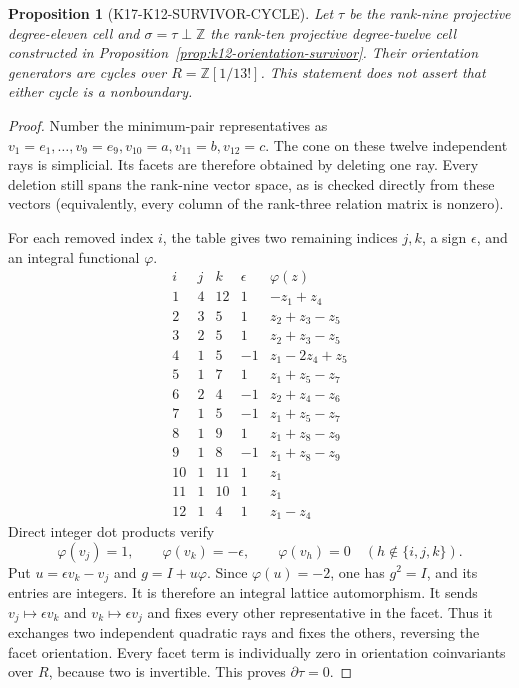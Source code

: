 \documentclass[11pt,a4paper]{article}
\newtheorem{proposition}[theorem]{Proposition}
\theoremstyle{definition}
\begin{document}
\begin{proposition}[K17-K12-SURVIVOR-CYCLE]
\label{prop:k12-survivor-cycle}
Let $\tau$ be the rank-nine projective degree-eleven cell and
$\sigma=\tau\perp\mathbb Z$ the rank-ten projective degree-twelve
cell constructed in Proposition~\ref{prop:k12-orientation-survivor}.
Their orientation generators are cycles over $R=\mathbb Z[1/13!]$.
This statement does not assert that either cycle is a nonboundary.
\end{proposition}

\begin{proof}
Number the minimum-pair representatives as
$v_1=e_1,\ldots,v_9=e_9,v_{10}=a,v_{11}=b,v_{12}=c$.
The cone on these twelve independent rays is simplicial. Its facets
are therefore obtained by deleting one ray. Every deletion still
spans the rank-nine vector space, as is checked directly from these
vectors (equivalently, every column of the rank-three relation
matrix is nonzero).

For each removed index $i$, the table gives two remaining indices
$j,k$, a sign $\epsilon$, and an integral functional $\varphi$.
\[
\begin{array}{c|cc|r|l}
i&j&k&\epsilon&\varphi(z)\\\hline
1&4&12&1&-z_1+z_4\\
2&3&5&1&z_2+z_3-z_5\\
3&2&5&1&z_2+z_3-z_5\\
4&1&5&-1&z_1-2z_4+z_5\\
5&1&7&1&z_1+z_5-z_7\\
6&2&4&-1&z_2+z_4-z_6\\
7&1&5&-1&z_1+z_5-z_7\\
8&1&9&1&z_1+z_8-z_9\\
9&1&8&-1&z_1+z_8-z_9\\
10&1&11&1&z_1\\
11&1&10&1&z_1\\
12&1&4&1&z_1-z_4
\end{array}
\]
Direct integer dot products verify
\[
\varphi(v_j)=1,\qquad \varphi(v_k)=-\epsilon,\qquad
\varphi(v_h)=0\quad(h\notin\{i,j,k\}).
\]
Put $u=\epsilon v_k-v_j$ and $g=I+u\varphi$.
Since $\varphi(u)=-2$, one has $g^2=I$, and its entries are integers.
It is therefore an integral lattice automorphism. It sends
$v_j\mapsto\epsilon v_k$ and $v_k\mapsto\epsilon v_j$ and fixes every
other representative in the facet. Thus it exchanges two independent
quadratic rays and fixes the others, reversing the facet orientation.
Every facet term is individually zero in orientation coinvariants
over $R$, because two is invertible. This proves $\partial\tau=0$.


\end{proof}
\end{document}
